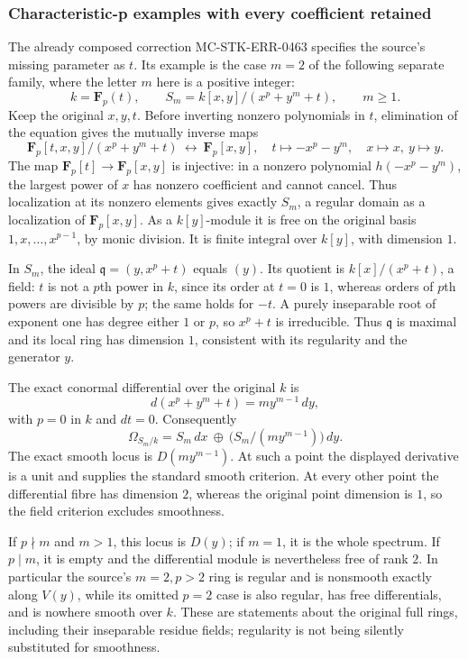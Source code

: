 \subsubsection{Characteristic-p examples with every coefficient retained}\label{algebra-proof-049-characteristic-p-examples-with-every-coefficient-retained}

The already composed correction MC-\AlgebraIdentifierBreak{}STK-\AlgebraIdentifierBreak{}ERR-\AlgebraIdentifierBreak{}0463 specifies the source's missing parameter as \(t\). Its example is the case \(m=2\) of the following separate family, where the letter \(m\) here is a positive integer: \[
k=\mathbf F_p(t),\qquad
S_m=k[x,y]/(x^p+y^m+t),\qquad m\ge1.
\] Keep the original \(x,y,t\). Before inverting nonzero polynomials in \(t\), elimination of the equation gives the mutually inverse maps \[
\mathbf F_p[t,x,y]/(x^p+y^m+t)\ \longleftrightarrow\ \mathbf F_p[x,y],
\quad t\longmapsto-x^p-y^m,\quad x\longmapsto x,\ y\longmapsto y.
\] The map \(\mathbf F_p[t]\to\mathbf F_p[x,y]\) is injective: in a nonzero polynomial \(h(-x^p-y^m)\), the largest power of \(x\) has nonzero coefficient and cannot cancel. Thus localization at its nonzero elements gives exactly \(S_m\), a regular domain as a localization of \(\mathbf F_p[x,y]\). As a \(k[y]\)-module it is free on the original basis \(1,x,\ldots,x^{p-1}\), by monic division. It is finite integral over \(k[y]\), with dimension \(1\).

In \(S_m\), the ideal \(\mathfrak q=(y,x^p+t)\) equals \((y)\). Its quotient is \(k[x]/(x^p+t)\), a field: \(t\) is not a \(p\)th power in \(k\), since its order at \(t=0\) is \(1\), whereas orders of \(p\)th powers are divisible by \(p\); the same holds for \(-t\). A purely inseparable root of exponent one has degree either \(1\) or \(p\), so \(x^p+t\) is irreducible. Thus \(\mathfrak q\) is maximal and its local ring has dimension \(1\), consistent with its regularity and the generator \(y\).

The exact conormal differential over the original \(k\) is \[
d(x^p+y^m+t)=m y^{m-1}\,dy,
\] with \(p=0\) in \(k\) and \(dt=0\). Consequently \[
\Omega_{S_m/k}=S_m\,dx\ \oplus\
\bigl(S_m/(m y^{m-1})\bigr)\,dy.
\] The exact smooth locus is \(D(m y^{m-1})\). At such a point the displayed derivative is a unit and supplies the standard smooth criterion. At every other point the differential fibre has dimension \(2\), whereas the original point dimension is \(1\), so the field criterion excludes smoothness.

If \(p\nmid m\) and \(m>1\), this locus is \(D(y)\); if \(m=1\), it is the whole spectrum. If \(p\mid m\), it is empty and the differential module is nevertheless free of rank \(2\). In particular the source's \(m=2,p>2\) ring is regular and is nonsmooth exactly along \(V(y)\), while its omitted \(p=2\) case is also regular, has free differentials, and is nowhere smooth over \(k\). These are statements about the original full rings, including their inseparable residue fields; regularity is not being silently substituted for smoothness.

